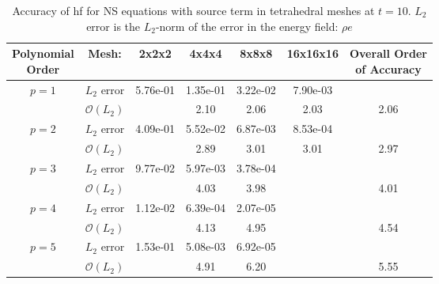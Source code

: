 \begin{table}[htbp]
\centering
\begin{tabular}{ c c c c c c c} 
  
 \specialcell{Polynomial\vspace{0.2cm}\\ Order} & Mesh: & 2x2x2 & 4x4x4 & 8x8x8 & 16x16x16 & \specialcell{Overall Order \vspace{0.2cm}\\ of Accuracy} \\ 
 \hline 
 \multirow{2}{*}{$p = 1$} & $L_2$ error & 5.76e-01 & 1.35e-01 & 3.22e-02 & 7.90e-03 &   \\ 
  
   & $\mathcal{O}(L_2)$ &   & 2.10 & 2.06 & 2.03 & 2.06 \\ 
 \hline 
 \multirow{2}{*}{$p = 2$} & $L_2$ error & 4.09e-01 & 5.52e-02 & 6.87e-03 & 8.53e-04 &   \\ 
  
   & $\mathcal{O}(L_2)$ &   & 2.89 & 3.01 & 3.01 & 2.97 \\ 
 \hline 
 \multirow{2}{*}{$p = 3$} & $L_2$ error & 9.77e-02 & 5.97e-03 & 3.78e-04 &   &   \\ 
  
   & $\mathcal{O}(L_2)$ &   & 4.03 & 3.98 &   & 4.01 \\ 
 \hline 
 \multirow{2}{*}{$p = 4$} & $L_2$ error & 1.12e-02 & 6.39e-04 & 2.07e-05 &   &   \\ 
  
   & $\mathcal{O}(L_2)$ &   & 4.13 & 4.95 &   & 4.54 \\ 
 \hline 
 \multirow{2}{*}{$p = 5$} & $L_2$ error & 1.53e-01 & 5.08e-03 & 6.92e-05 &   &   \\ 
  
   & $\mathcal{O}(L_2)$ &   & 4.91 & 6.20 &   & 5.55 \\ 
 \hline 
 \end{tabular}
\caption{Accuracy of \gls{hf} for NS equations with source term in tetrahedral meshes at $t = 10$. $L_2$ error is the $L_2$-norm of the error in the energy field: $\rho e$}
\label{table:tetsError1} 
 \end{table}
